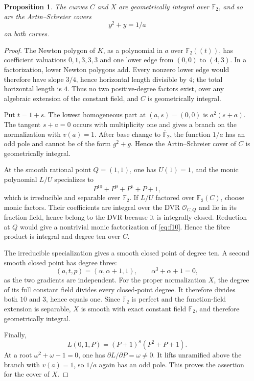 \documentclass[11pt]{article}
\newtheorem{proposition}[theorem]{Proposition}
\theoremstyle{definition}\newtheorem{definition}[theorem]{Definition}
\theoremstyle{remark}\newtheorem{remark}[theorem]{Remark}
\newcommand{\F}{\mathbb F}
\begin{document}
\begin{proposition}
\label{prop:geometry}
The curves \(C\) and \(X\) are geometrically integral over \(\F_2\), and so
are the Artin--Schreier covers
\begin{equation}
 y^2+y=1/a
 \label{eq:AS}
\end{equation}
on both curves.
\end{proposition}
\begin{proof}
The Newton polygon of \(K\), as a polynomial in \(a\) over
\(\F_2((t))\), has coefficient valuations \(0,1,3,3,3\) and one lower
edge from \((0,0)\) to \((4,3)\).  In a factorization, lower Newton polygons
add.  Every nonzero lower edge would therefore have slope \(3/4\), hence
horizontal length divisible by \(4\); the total horizontal length is \(4\).
Thus no two positive-degree factors exist, over any algebraic extension of
the constant field, and \(C\) is geometrically integral.

Put \(t=1+s\).  The lowest homogeneous part at \((a,s)=(0,0)\) is
\(a^2(s+a)\).  The tangent \(s+a=0\) occurs with multiplicity one and gives a
branch on the normalization with \(v(a)=1\).  After base change to
\(\overline{\F}_2\), the function \(1/a\) has an odd pole and cannot be of the
form \(g^2+g\).  Hence the Artin--Schreier cover of \(C\) is geometrically
integral.

At the smooth rational point \(Q=(1,1)\), one has \(U(1)=1\), and the monic
polynomial \(L/U\)
specializes to
\begin{equation}
 P^{10}+P^9+P^5+P+1,
 \label{eq:f10}
\end{equation}
which is irreducible and separable over \(\F_2\).  If \(L/U\) factored over
\(\F_2(C)\), choose monic factors.  Their coefficients are integral over the
DVR \(\mathcal O_{C,Q}\) and lie in its fraction field, hence belong to the
DVR because it is integrally closed.  Reduction at \(Q\) would give a
nontrivial monic factorization of \eqref{eq:f10}.  Hence the fibre product is
integral and degree ten over \(C\).

The irreducible specialization gives a smooth closed point of degree ten.
A second smooth closed point has degree three:
\[
 (a,t,p)=(\alpha,\alpha+1,1),\qquad \alpha^3+\alpha+1=0,
\]
as the two gradients are independent.  For the proper normalization \(X\),
the degree of its full constant field divides every closed-point degree.  It
therefore divides both \(10\) and \(3\), hence equals one.  Since \(\F_2\) is
perfect and the function-field extension is separable, \(X\) is smooth with
exact constant field \(\F_2\), and therefore geometrically integral.

Finally,
\[
 L(0,1,P)=(P+1)^8(P^2+P+1).
\]
At a root \(\omega^2+\omega+1=0\), one has
\(\partial L/\partial P=\omega\neq0\).  It lifts unramified above the branch
with \(v(a)=1\), so \(1/a\) again has an odd pole.  This proves the assertion
for the cover of \(X\).
\end{proof}
\end{document}
